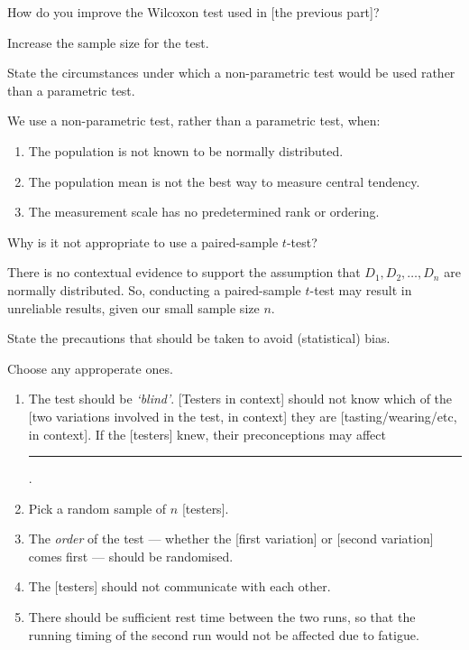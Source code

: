 \documentclass[../Notes.tex]{subfiles}
\begin{document}
\begin{note}
  How do you improve the Wilcoxon test used in [the previous part]?
  \begin{center}
    Increase the sample size for the test.
  \end{center}
\end{note}
\begin{note}
  State the circumstances under which a non-parametric test would be used rather than a parametric test.
  \begin{center}
    \parbox{0.9\textwidth}{
      We use a non-parametric test, rather than a parametric test, when:
      \begin{enumerate}
        \item The population is not known to be normally distributed.
        \item The population mean is not the best way to measure central tendency.
        \item The measurement scale has no predetermined rank or ordering. 
      \end{enumerate}
    }
  \end{center}
\end{note}
\begin{note}
  Why is it not appropriate to use a paired-sample \(t\)-test? 
  \begin{center}
    \parbox{0.9\textwidth}{
      There is no contextual evidence to support the assumption that \(D_1,D_2,\dots,D_n\) are normally distributed. So, conducting a paired-sample \(t\)-test may result in unreliable results, given our small sample size \(n\). 
    }
  \end{center}
\end{note}
\begin{note}
  State the precautions that should be taken to avoid (statistical) bias. 
  \begin{center}
    \parbox{0.9\textwidth}{
      Choose any approperate ones.
      \begin{enumerate}
        \item The test should be \emph{`blind'}. [Testers in context] should not know which of the [two variations involved in the test, in context] they are [tasting/wearing/etc, in context]. If the [testers] knew, their preconceptions may affect \rule{2cm}{0.01mm}.
        \item Pick a random sample of \(n\) [testers].
        \item The \emph{order} of the test --- whether the [first variation] or [second variation] comes first --- should be randomised.
        \item The [testers] should not communicate with each other.
        \item There should be sufficient rest time between the two runs, so that the running timing of the second run would not be affected due to fatigue.
      \end{enumerate}
    }
  \end{center}
\end{note}
\end{document}

